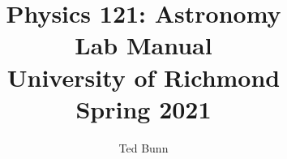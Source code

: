 \documentclass[twoside]{report}
\renewcommand{\chaptername}{Lab}
\begin{document}
\title{Physics 121: Astronomy \\ Lab Manual \\ University of Richmond
\\ Spring 2021}
\author{Ted Bunn}
\maketitle
\tableofcontents





%


















%

%










\appendix
\renewcommand{\chaptername}{Appendix}
%


\end{document}
